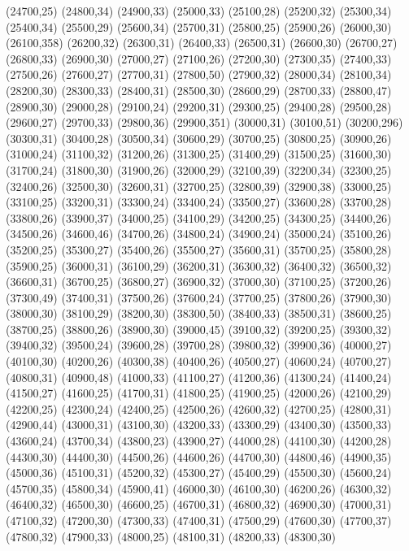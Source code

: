(24700,25)
(24800,34)
(24900,33)
(25000,33)
(25100,28)
(25200,32)
(25300,34)
(25400,34)
(25500,29)
(25600,34)
(25700,31)
(25800,25)
(25900,26)
(26000,30)
(26100,358)
(26200,32)
(26300,31)
(26400,33)
(26500,31)
(26600,30)
(26700,27)
(26800,33)
(26900,30)
(27000,27)
(27100,26)
(27200,30)
(27300,35)
(27400,33)
(27500,26)
(27600,27)
(27700,31)
(27800,50)
(27900,32)
(28000,34)
(28100,34)
(28200,30)
(28300,33)
(28400,31)
(28500,30)
(28600,29)
(28700,33)
(28800,47)
(28900,30)
(29000,28)
(29100,24)
(29200,31)
(29300,25)
(29400,28)
(29500,28)
(29600,27)
(29700,33)
(29800,36)
(29900,351)
(30000,31)
(30100,51)
(30200,296)
(30300,31)
(30400,28)
(30500,34)
(30600,29)
(30700,25)
(30800,25)
(30900,26)
(31000,24)
(31100,32)
(31200,26)
(31300,25)
(31400,29)
(31500,25)
(31600,30)
(31700,24)
(31800,30)
(31900,26)
(32000,29)
(32100,39)
(32200,34)
(32300,25)
(32400,26)
(32500,30)
(32600,31)
(32700,25)
(32800,39)
(32900,38)
(33000,25)
(33100,25)
(33200,31)
(33300,24)
(33400,24)
(33500,27)
(33600,28)
(33700,28)
(33800,26)
(33900,37)
(34000,25)
(34100,29)
(34200,25)
(34300,25)
(34400,26)
(34500,26)
(34600,46)
(34700,26)
(34800,24)
(34900,24)
(35000,24)
(35100,26)
(35200,25)
(35300,27)
(35400,26)
(35500,27)
(35600,31)
(35700,25)
(35800,28)
(35900,25)
(36000,31)
(36100,29)
(36200,31)
(36300,32)
(36400,32)
(36500,32)
(36600,31)
(36700,25)
(36800,27)
(36900,32)
(37000,30)
(37100,25)
(37200,26)
(37300,49)
(37400,31)
(37500,26)
(37600,24)
(37700,25)
(37800,26)
(37900,30)
(38000,30)
(38100,29)
(38200,30)
(38300,50)
(38400,33)
(38500,31)
(38600,25)
(38700,25)
(38800,26)
(38900,30)
(39000,45)
(39100,32)
(39200,25)
(39300,32)
(39400,32)
(39500,24)
(39600,28)
(39700,28)
(39800,32)
(39900,36)
(40000,27)
(40100,30)
(40200,26)
(40300,38)
(40400,26)
(40500,27)
(40600,24)
(40700,27)
(40800,31)
(40900,48)
(41000,33)
(41100,27)
(41200,36)
(41300,24)
(41400,24)
(41500,27)
(41600,25)
(41700,31)
(41800,25)
(41900,25)
(42000,26)
(42100,29)
(42200,25)
(42300,24)
(42400,25)
(42500,26)
(42600,32)
(42700,25)
(42800,31)
(42900,44)
(43000,31)
(43100,30)
(43200,33)
(43300,29)
(43400,30)
(43500,33)
(43600,24)
(43700,34)
(43800,23)
(43900,27)
(44000,28)
(44100,30)
(44200,28)
(44300,30)
(44400,30)
(44500,26)
(44600,26)
(44700,30)
(44800,46)
(44900,35)
(45000,36)
(45100,31)
(45200,32)
(45300,27)
(45400,29)
(45500,30)
(45600,24)
(45700,35)
(45800,34)
(45900,41)
(46000,30)
(46100,30)
(46200,26)
(46300,32)
(46400,32)
(46500,30)
(46600,25)
(46700,31)
(46800,32)
(46900,30)
(47000,31)
(47100,32)
(47200,30)
(47300,33)
(47400,31)
(47500,29)
(47600,30)
(47700,37)
(47800,32)
(47900,33)
(48000,25)
(48100,31)
(48200,33)
(48300,30)
